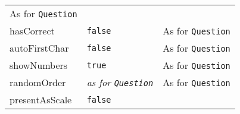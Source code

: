 \documentclass[
]{article}
\begin{document}
\begin{RaggedRight}
\begin{longtable}[]{p{1.7in}p{1in}p{3.15in}}
\begin{minipage}[t]{0.49\columnwidth}
As for \texttt{Question}\strut
\end{minipage}\tabularnewline
\begin{minipage}[t]{0.17\columnwidth}\raggedright
hasCorrect\strut
\end{minipage} & \begin{minipage}[t]{0.25\columnwidth}\raggedright
\texttt{false}\strut
\end{minipage} & \begin{minipage}[t]{0.49\columnwidth}\raggedright
As for \texttt{Question}\strut
\end{minipage}\tabularnewline
\begin{minipage}[t]{0.17\columnwidth}\raggedright
autoFirstChar\strut
\end{minipage} & \begin{minipage}[t]{0.25\columnwidth}\raggedright
\texttt{false}\strut
\end{minipage} & \begin{minipage}[t]{0.49\columnwidth}\raggedright
As for \texttt{Question}\strut
\end{minipage}\tabularnewline
\begin{minipage}[t]{0.17\columnwidth}\raggedright
showNumbers\strut
\end{minipage} & \begin{minipage}[t]{0.25\columnwidth}\raggedright
\texttt{true}\strut
\end{minipage} & \begin{minipage}[t]{0.49\columnwidth}\raggedright
As for \texttt{Question}\strut
\end{minipage}\tabularnewline
\begin{minipage}[t]{0.17\columnwidth}\raggedright
randomOrder\strut
\end{minipage} & \begin{minipage}[t]{0.25\columnwidth}\raggedright
\emph{as for \texttt{Question}}\strut
\end{minipage} & \begin{minipage}[t]{0.49\columnwidth}\raggedright
As for \texttt{Question}\strut
\end{minipage}\tabularnewline
\begin{minipage}[t]{0.17\columnwidth}\raggedright
presentAsScale\strut
\end{minipage} & \begin{minipage}[t]{0.25\columnwidth}\raggedright
\texttt{false}\strut
\end{minipage} & \begin{minipage}[t]{0.49\columnwidth}\raggedright

\end{minipage}
\end{longtable}
\end{RaggedRight}
\end{document}
